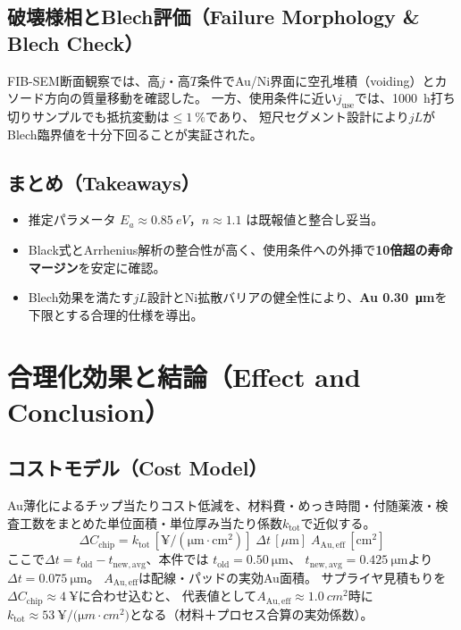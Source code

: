 \documentclass[conference]{IEEEtran}
\begin{document}
\subsection{破壊様相とBlech評価（Failure Morphology \& Blech Check）}
FIB-SEM断面観察では、高$j$・高$T$条件でAu/Ni界面に空孔堆積（voiding）とカソード方向の質量移動を確認した。
一方、使用条件に近い$j_{\mathrm{use}}$では、\SI{1000}{h}打ち切りサンプルでも抵抗変動は$\le \SI{1}{\%}$であり、
短尺セグメント設計により$jL$がBlech臨界値を十分下回ることが実証された\cite{Blech, Korhonen}。

\subsection{まとめ（Takeaways）}
\begin{itemize}
  \item 推定パラメータ $E_a\!\approx\!\SI{0.85}{eV}$，$n\!\approx\!1.1$ は既報値と整合し妥当。
  \item Black式とArrhenius解析の整合性が高く、使用条件への外挿で\textbf{10倍超の寿命マージン}を安定に確認。
  \item Blech効果を満たす$jL$設計とNi拡散バリアの健全性により、\textbf{Au \SI{0.30}{\micro\meter}}を下限とする合理的仕様を導出。
\end{itemize}

\section{合理化効果と結論（Effect and Conclusion）}
\subsection{コストモデル（Cost Model）}
Au薄化によるチップ当たりコスト低減を、材料費・めっき時間・付随薬液・検査工数をまとめた単位面積・単位厚み当たり係数$k_{\mathrm{tot}}$で近似する。
\begin{equation}
  \Delta C_{\mathrm{chip}}
  = k_{\mathrm{tot}}\,[\mathrm{¥/(\mu m\cdot cm^2)}]\;
    \Delta t\,[\mu\mathrm{m}]\;
    A_{\mathrm{Au,eff}}\,[\mathrm{cm}^2]
  \label{eq:cost}
\end{equation}
ここで$\Delta t=t_{\mathrm{old}}-t_{\mathrm{new,avg}}$、本件では
$t_{\mathrm{old}}=\SI{0.50}{\micro\meter}$、
$t_{\mathrm{new,avg}}=\SI{0.425}{\micro\meter}$より
$\Delta t=\SI{0.075}{\micro\meter}$。
$A_{\mathrm{Au,eff}}$は配線・パッドの実効Au面積。
サプライヤ見積もりを$\Delta C_{\mathrm{chip}}\approx\SI{4}{¥}$に合わせ込むと、
代表値として$A_{\mathrm{Au,eff}}\approx\SI{1.0}{cm^2}$時に
$k_{\mathrm{tot}}\approx\SI{53}{¥/(\micro m\cdot cm^2)}$となる（材料＋プロセス合算の実効係数）。
\end{document}
